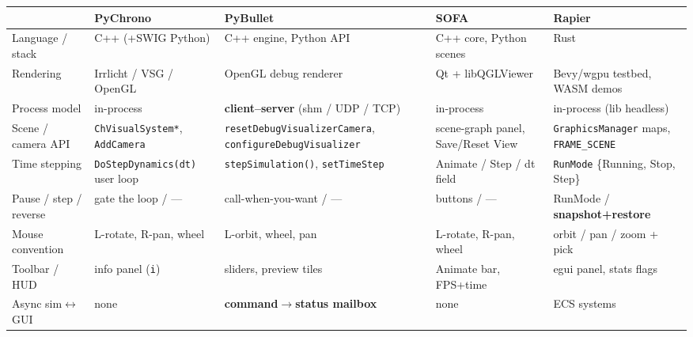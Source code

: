 \documentclass[11pt]{article}
\newcommand{\code}[1]{\texttt{#1}}
\begin{document}
\begin{center}\small
\begin{tabular}{lp{3.1cm}p{3.3cm}p{2.9cm}p{3.2cm}}
 & \textbf{PyChrono} & \textbf{PyBullet} & \textbf{SOFA} & \textbf{Rapier}\\\hline
Language / stack & C++ (+SWIG Python) & C++ engine, Python API & C++ core, Python scenes & Rust\\
Rendering & Irrlicht / VSG / OpenGL & OpenGL debug renderer & Qt + libQGLViewer & Bevy/wgpu testbed, WASM demos\\
Process model & in-process & \textbf{client--server} (shm / UDP / TCP) & in-process & in-process (lib headless)\\
Scene / camera API & \code{ChVisualSystem*}, \code{AddCamera} & \code{resetDebugVisualizerCamera}, \code{configureDebugVisualizer} & scene-graph panel, Save/Reset View & \code{GraphicsManager} maps, \code{FRAME\_SCENE}\\
Time stepping & \code{DoStepDynamics(dt)} user loop & \code{stepSimulation()}, \code{setTimeStep} & Animate / Step / dt field & \code{RunMode} \{Running, Stop, Step\}\\
Pause / step / reverse & gate the loop / --- & call-when-you-want / --- & buttons / --- & RunMode / \textbf{snapshot+restore}\\
Mouse convention & L-rotate, R-pan, wheel & L-orbit, wheel, pan & L-rotate, R-pan, wheel & orbit / pan / zoom + pick\\
Toolbar / HUD & info panel (\code{i}) & sliders, preview tiles & Animate bar, FPS+time & egui panel, stats flags\\
Async sim$\leftrightarrow$GUI & none & \textbf{command$\to$status mailbox} & none & ECS systems\\
\end{tabular}
\end{center}
\end{document}
